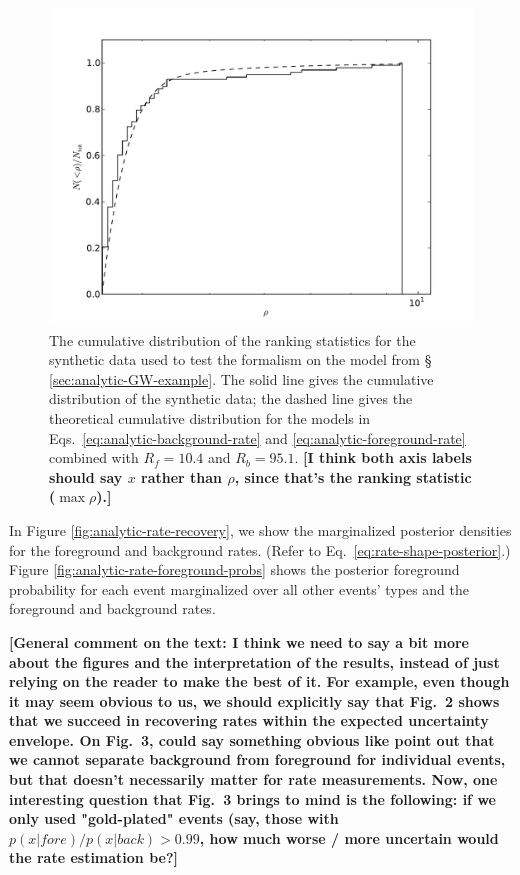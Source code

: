 \documentclass[aps,prd]{revtex4-1}
\newcommand{\ilya}[1]{{\color{red} \bf #1}}
\begin{document}
\begin{figure}
  \includegraphics[width=\columnwidth]{data}
  \caption{\label{fig:analytic-data-cumulative} The cumulative
    distribution of the ranking statistics for the synthetic data used
    to test the formalism on the model from \S
    \ref{sec:analytic-GW-example}.  The solid line gives the
    cumulative distribution of the synthetic data; the dashed line
    gives the theoretical cumulative distribution for the models in
    Eqs.~\eqref{eq:analytic-background-rate} and
    \eqref{eq:analytic-foreground-rate} combined with $R_f = 10.4$ and
    $R_b = 95.1$. \ilya{[I think both axis labels should say $x$
        rather than $\rho$, since that's the ranking statistic ($\max
        \rho$).]}}
\end{figure}

In Figure \ref{fig:analytic-rate-recovery}, we show the marginalized
posterior densities for the foreground and background rates.  (Refer
to Eq.~\eqref{eq:rate-shape-posterior}.)  Figure
\ref{fig:analytic-rate-foreground-probs} shows the posterior
foreground probability for each event marginalized over all other
events' types and the foreground and background rates.

\ilya{[General comment on the text: I think we need to say a bit more
    about the figures and the interpretation of the results, instead
    of just relying on the reader to make the best of it.  For
    example, even though it may seem obvious to us, we should
    explicitly say that Fig.~2 shows that we succeed in recovering
    rates within the expected uncertainty envelope.  On Fig.~3, could
    say something obvious like point out that we cannot separate
    background from foreground for individual events, but that doesn't
    necessarily matter for rate measurements.  Now, one interesting
    question that Fig.~3 brings to mind is the following: if we only
    used "gold-plated" events (say, those with
    $p(x|fore)/p(x|back)>0.99$, how much worse / more uncertain would
    the rate estimation be?]}
\end{document}
